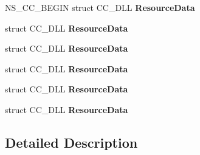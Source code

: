 \begin{DoxyCompactItemize}
N\+S\+\_\+\+C\+C\+\_\+\+B\+E\+G\+IN struct C\+C\+\_\+\+D\+LL {\bfseries Resource\+Data}
\item 
\mbox{\label{group__ui_gaea51324d1dbe3670e21d286c9c676c7c}} 
struct C\+C\+\_\+\+D\+LL {\bfseries Resource\+Data}
\item 
\mbox{\label{group__ui_gaea51324d1dbe3670e21d286c9c676c7c}} 
struct C\+C\+\_\+\+D\+LL {\bfseries Resource\+Data}
\item 
\mbox{\label{group__ui_gaea51324d1dbe3670e21d286c9c676c7c}} 
struct C\+C\+\_\+\+D\+LL {\bfseries Resource\+Data}
\item 
\mbox{\label{group__ui_gaea51324d1dbe3670e21d286c9c676c7c}} 
struct C\+C\+\_\+\+D\+LL {\bfseries Resource\+Data}
\item 
\mbox{\label{group__ui_gaea51324d1dbe3670e21d286c9c676c7c}} 
struct C\+C\+\_\+\+D\+LL {\bfseries Resource\+Data}
\end{DoxyCompactItemize}


\subsection{Detailed Description}
